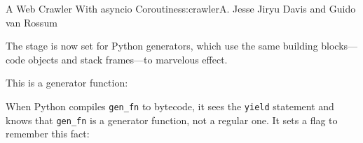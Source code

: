 \begin{aosachapter}{A Web Crawler With asyncio Coroutines}{s:crawler}{A. Jesse Jiryu Davis and Guido van Rossum}
\begin{Shaded}
\begin{Highlighting}[]
\NormalTok{>>> } 
\NormalTok{>>> } 
\NormalTok{>>> } 
 
\NormalTok{>>> }
\NormalTok{>>> }
\end{Highlighting}
\end{Shaded}

The stage is now set for Python generators, which use the same building
blocks---code objects and stack frames---to marvelous effect.

This is a generator function:

\begin{Shaded}
\begin{Highlighting}[]
\NormalTok{>>> } 
 
\NormalTok{(}
 
\NormalTok{(}
 
\end{Highlighting}
\end{Shaded}

When Python compiles \texttt{gen\_fn} to bytecode, it sees the
\texttt{yield} statement and knows that \texttt{gen\_fn} is a generator
function, not a regular one. It sets a flag to remember this fact:

\begin{Shaded}
\begin{Highlighting}[]
\NormalTok{>>> }
 \NormalTok{<< }
\NormalTok{>>> }
\end{Highlighting}
\end{Shaded}


\end{aosachapter}
